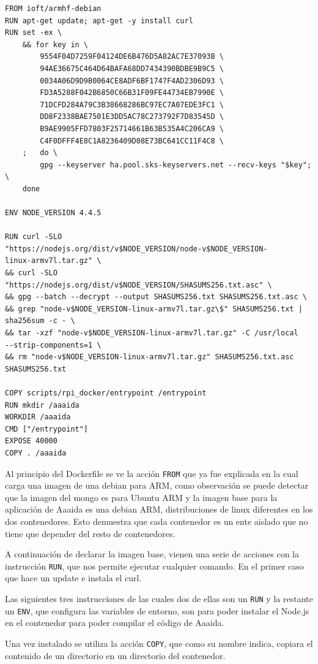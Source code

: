 \begin{verbatim}
FROM ioft/armhf-debian
RUN apt-get update; apt-get -y install curl
RUN set -ex \  
	&& for key in \    
		9554F04D7259F04124DE6B476D5A82AC7E37093B \ 
        94AE36675C464D64BAFA68DD7434390BDBE9B9C5 \
        0034A06D9D9B0064CE8ADF6BF1747F4AD2306D93 \ 
        FD3A5288F042B6850C66B31F09FE44734EB7990E \    
        71DCFD284A79C3B38668286BC97EC7A07EDE3FC1 \    
        DD8F2338BAE7501E3DD5AC78C273792F7D83545D \    
        B9AE9905FFD7803F25714661B63B535A4C206CA9 \    
        C4F0DFFF4E8C1A8236409D08E73BC641CC11F4C8 \  
	; 	do \  
		gpg --keyserver ha.pool.sks-keyservers.net --recv-keys "$key"; \  
	done

ENV NODE_VERSION 4.4.5

RUN curl -SLO 
"https://nodejs.org/dist/v$NODE_VERSION/node-v$NODE_VERSION-
linux-armv7l.tar.gz" \  
&& curl -SLO "https://nodejs.org/dist/v$NODE_VERSION/SHASUMS256.txt.asc" \  
&& gpg --batch --decrypt --output SHASUMS256.txt SHASUMS256.txt.asc \  
&& grep "node-v$NODE_VERSION-linux-armv7l.tar.gz\$" SHASUMS256.txt | 
sha256sum -c - \  
&& tar -xzf "node-v$NODE_VERSION-linux-armv7l.tar.gz" -C /usr/local 
--strip-components=1 \  
&& rm "node-v$NODE_VERSION-linux-armv7l.tar.gz" SHASUMS256.txt.asc 
SHASUMS256.txt

COPY scripts/rpi_docker/entrypoint /entrypoint
RUN mkdir /aaaida
WORKDIR /aaaida
CMD ["/entrypoint"]
EXPOSE 40000
COPY . /aaaida
\end{verbatim}

Al principio del Dockerfile se ve la acción \texttt{FROM} que ya fue explicada en la cual carga una imagen de una debian para ARM, como observación se puede detectar que la imagen del mongo es para Ubuntu ARM y la imagen base para la aplicación de Aaaida es una debian ARM, distribuciones de linux diferentes en los dos contenedores. Esto demuestra que cada contenedor es un ente aislado que no tiene que depender del resto de contenedores.
 
A continuación de declarar la imagen base, vienen una serie de acciones con la instrucción \texttt{RUN}, que nos permite ejecutar cualquier comando. En el primer caso que hace un update e instala el curl.
 
Las siguientes tres instrucciones de las cuales dos de ellas son un \texttt{RUN} y la restante un \texttt{ENV}, que configura las variables de entorno, son para poder instalar el Node.js en el contenedor para poder compilar el código de Aaaida.
 
Una vez instalado se utiliza la acción \texttt{COPY}, que como su nombre indica, copiara el contenido de un directorio en un directorio del contenedor.

